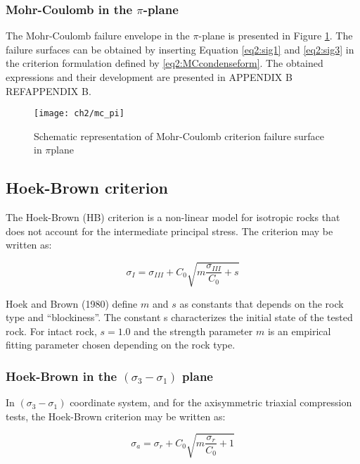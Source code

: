\subsubsection{Mohr-Coulomb in the \texorpdfstring{$\pi$}{pi}-plane}\label{ch2:MC_pi}

The Mohr-Coulomb failure envelope in the $\pi$-plane is presented in Figure \ref{fig2:mc_pi}. The failure surfaces can be obtained by inserting Equation \ref{eq2:sig1} and \ref{eq2:sig3} in the criterion formulation defined by \ref{eq2:MCcondenseform}. The obtained expressions and their development are presented in APPENDIX B REF{APPENDIX B}. 

\begin{figure}[tb]
    \centering
    \texttt{[image: ch2/mc\_pi]}
    \caption{Schematic representation of Mohr-Coulomb criterion failure surface in  $\pi$plane}
    \label{fig2:mc_pi}
\end{figure} 

\subsection{Hoek-Brown criterion}

The Hoek-Brown (HB) criterion is a non-linear model for isotropic rocks that does not account for the intermediate principal stress. The criterion may be written as:

\begin{equation}\label{eq2:HB-crit}
    \sigma_{I}=\sigma_{III}+C_{0} \sqrt{m \frac{\sigma_{III}}{C_{0}}+s}
\end{equation}

Hoek and Brown (1980) \cite{Hoek1980} define $m$ and $s$  as constants that depends on the rock type and “blockiness”. The constant s characterizes the initial state of the tested rock. For intact rock, $s=1.0$ and the strength parameter $m$ is an empirical fitting parameter chosen depending on the rock type.  

\subsubsection{Hoek-Brown in the \texorpdfstring{$(\sigma_3 -\sigma_1)$}{sigma 3 - sigma 1} plane}

In $(\sigma_3 -\sigma_1)$ coordinate system, and for the axisymmetric triaxial compression tests, the Hoek-Brown criterion may be written as:

\begin{equation}\label{eq2:HBsig1_CTC}
    \sigma_{a}=\sigma_{r}+C_{0} \sqrt{m \frac{\sigma_{r}}{C_{0}}+1}
\end{equation}

